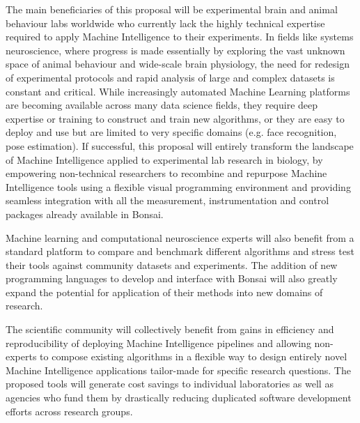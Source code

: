 The main beneficiaries of this proposal will be experimental brain and animal behaviour labs worldwide who currently lack the highly technical expertise required to apply Machine Intelligence to their experiments. In fields like systems neuroscience, where progress is made essentially by exploring the vast unknown space of animal behaviour and wide-scale brain physiology, the need for redesign of experimental protocols and rapid analysis of large and complex datasets is constant and critical. While increasingly automated Machine Learning platforms are becoming available across many data science fields, they require deep expertise or training to construct and train new algorithms, or they are easy to deploy and use but are limited to very specific domains (e.g. face recognition, pose estimation). If successful, this proposal will entirely transform the landscape of Machine Intelligence applied to experimental lab research in biology, by empowering non-technical researchers to recombine and repurpose Machine Intelligence tools using a flexible visual programming environment and providing seamless integration with all the measurement, instrumentation and control packages already available in Bonsai.

Machine learning and computational neuroscience experts will also benefit from a standard platform to compare and benchmark different algorithms and stress test their tools against community datasets and experiments. The addition of new programming languages to develop and interface with Bonsai will also greatly expand the potential for application of their methods into new domains of research.

The scientific community will collectively benefit from gains in efficiency and reproducibility of deploying Machine Intelligence pipelines and allowing non-experts to compose existing algorithms in a flexible way to design entirely novel Machine Intelligence applications tailor-made for specific research questions. The proposed tools will generate cost savings to individual laboratories as well as agencies who fund them by drastically reducing duplicated software development efforts across research groups.

